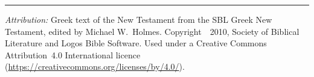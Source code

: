 \documentclass[11pt,oneside]{article}
\begin{document}
\vspace{2em}

\noindent\rule{0.5\textwidth}{0.4pt}\par
\vspace{0.5em}
\small\noindent\textit{Attribution:} Greek text of the New Testament
from the SBL Greek New Testament, edited by Michael W.\ Holmes.
Copyright~\textcopyright~2010, Society of Biblical Literature and
Logos Bible Software.  Used under a Creative Commons Attribution~4.0
International licence (\url{https://creativecommons.org/licenses/by/4.0/}).
\end{document}
